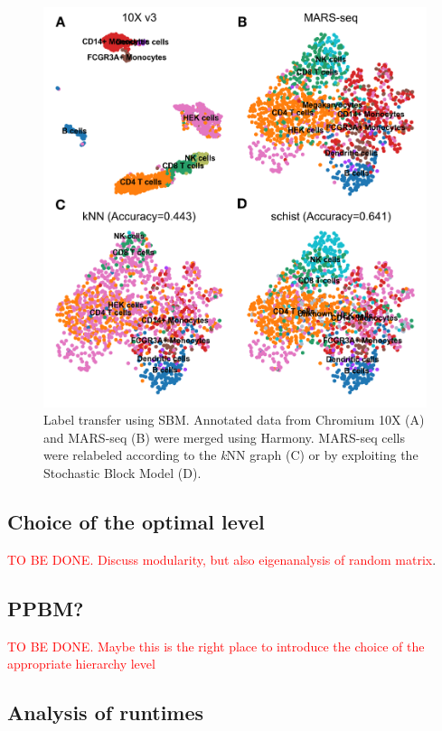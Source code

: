 \documentclass[10pt]{article}
\begin{document}
\begin{figure}[H]
\centering
\includegraphics[keepaspectratio,width=\textwidth,height=0.55\textheight]{Figure_Label_Transfer.png}
\caption[]{Label transfer using SBM. Annotated data from Chromium 10X (A) and  MARS-seq (B) were merged using Harmony. MARS-seq cells were relabeled according to the \emph{k}NN graph (C) or by exploiting the Stochastic Block Model (D). }\label{Figure_Label_Transfer}
\end{figure}


\subsection*{Choice of the optimal level}

\textcolor{red}{TO BE DONE. Discuss modularity, but also eigenanalysis of random matrix}.

\subsection*{PPBM?}

\textcolor{red}{TO BE DONE. Maybe this is the right place to introduce the choice of the appropriate hierarchy level}


\subsection*{Analysis of runtimes}
\end{document}

